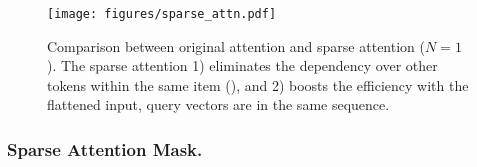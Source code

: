 \begin{figure}[t]
\setlength{\abovecaptionskip}{0.02cm}
\setlength{\belowcaptionskip}{-0.3cm}
\centering
\texttt{[image: figures/sparse\_attn.pdf]}
\setlength{\fboxrule}{1pt}
\caption{Comparison between original attention and sparse attention ($N=1$). The sparse attention 1) eliminates the dependency over other tokens within the same item ({\color{myred}\fbox{\phantom{\rule{0.06cm}{0.06cm}}}}), and 2) boosts the efficiency with the flattened input, \ie query vectors are in the same sequence.}
\label{fig:sparse_attn}
\end{figure}

\vspace{2pt}
\subsubsection{\textbf{Sparse Attention Mask.}}\label{sec:sparse_attention_mask}


